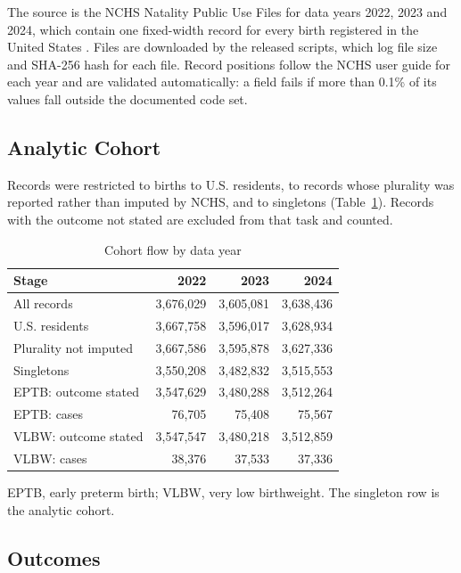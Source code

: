 \documentclass[journal]{IEEEtran}
\begin{document}
The source is the NCHS Natality Public Use Files for data years 2022, 2023 and 2024, which contain one fixed-width record for every birth registered in the United States \cite{nchs2024guide}. Files are downloaded by the released scripts, which log file size and SHA-256 hash for each file. Record positions follow the NCHS user guide for each year and are validated automatically: a field fails if more than 0.1\% of its values fall outside the documented code set.

\subsection{Analytic Cohort}

Records were restricted to births to U.S. residents, to records whose plurality was reported rather than imputed by NCHS, and to singletons (Table~\ref{tab:cohort}). Records with the outcome not stated are excluded from that task and counted.

\begin{table}[!t]
\centering
\footnotesize
\caption{Cohort flow by data year}
\label{tab:cohort}
\begin{tabular}{@{}lrrr@{}}
\toprule
\textbf{Stage} & \textbf{2022} & \textbf{2023} & \textbf{2024} \\
\midrule
All records & 3,676,029 & 3,605,081 & 3,638,436 \\
U.S. residents & 3,667,758 & 3,596,017 & 3,628,934 \\
Plurality not imputed & 3,667,586 & 3,595,878 & 3,627,336 \\
Singletons & 3,550,208 & 3,482,832 & 3,515,553 \\
EPTB: outcome stated & 3,547,629 & 3,480,288 & 3,512,264 \\
EPTB: cases & 76,705 & 75,408 & 75,567 \\
VLBW: outcome stated & 3,547,547 & 3,480,218 & 3,512,859 \\
VLBW: cases & 38,376 & 37,533 & 37,336 \\
\bottomrule
\end{tabular}
\par\vspace{2pt}\parbox{\columnwidth}{\scriptsize EPTB, early preterm birth; VLBW, very low birthweight. The singleton row is the analytic cohort.}
\end{table}

\subsection{Outcomes}
\end{document}
